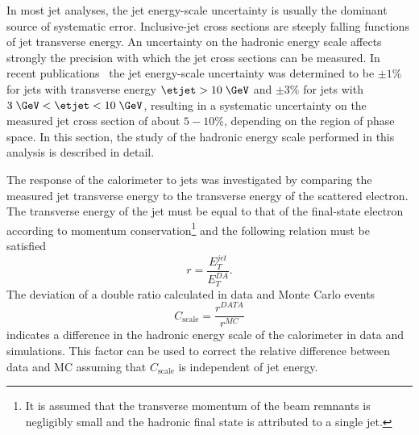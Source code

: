 In most jet analyses, the jet energy-scale uncertainty is usually the dominant source of systematic error. Inclusive-jet cross sections are steeply falling functions of jet transverse energy. An uncertainty on the hadronic energy scale affects strongly the precision with which the jet cross sections can be measured. In recent \zeus publications~\cite{epj:c70:965, np:b864:1} the jet energy-scale uncertainty was determined to be $\pm 1\%$ for jets with transverse energy $\etjet>10\; \GeV$ and $\pm 3\%$ for jets with $3\; \GeV<\etjet < 10\; \GeV$, resulting in a systematic uncertainty on the measured jet cross section of about $5-10\%$, depending on the region of phase space. In this section, the study of the hadronic energy scale performed in this analysis is described in detail.

The response of the calorimeter to jets was investigated by comparing the measured jet transverse energy to the transverse energy of the scattered electron. The transverse energy of the jet must be equal to that of the final-state electron according to momentum conservation\footnote{It is assumed that the transverse momentum of the beam remnants is negligibly small and the hadronic final state is attributed to a single jet.} and the following relation must be satisfied
\begin{equation}
r = \frac{E_T^{jet}}{E_T^{DA}}.
\label{eq:etjetetelbalance}
\end{equation}
The deviation of a double ratio calculated in data and Monte Carlo events
\begin{equation}
C_\text{scale} = \frac{r^{DATA}}{r^{MC}} 
\label{eq:cscale}
\end{equation}
indicates a difference in the hadronic energy scale of the calorimeter in data and simulations. This factor can be used to correct the relative difference between data and MC assuming that $C_\text{scale}$ is independent of jet energy. 

